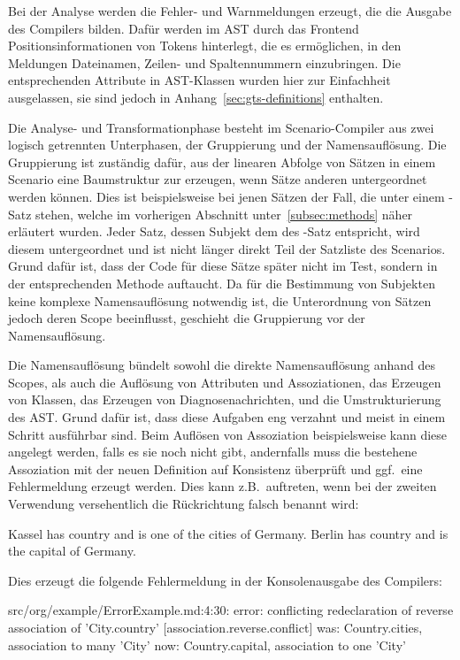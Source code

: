 Bei der Analyse werden die Fehler- und Warnmeldungen erzeugt, die die Ausgabe des Compilers bilden.
Dafür werden im AST durch das Frontend Positionsinformationen von Tokens hinterlegt, die es ermöglichen,
in den Meldungen Dateinamen, Zeilen- und Spaltennummern einzubringen.
Die entsprechenden Attribute in AST-Klassen wurden hier zur Einfachheit ausgelassen,
sie sind jedoch in Anhang~\ref{sec:gts-definitions} enthalten.

Die Analyse- und Transformationphase besteht im Scenario-Compiler aus zwei logisch getrennten Unterphasen,
der Gruppierung und der Namensauflösung.
Die Gruppierung ist zuständig dafür, aus der linearen Abfolge von Sätzen in einem Scenario eine Baumstruktur zur erzeugen,
wenn Sätze anderen untergeordnet werden können.
Dies ist beispielsweise bei jenen Sätzen der Fall, die unter einem -Satz stehen, welche im vorherigen Abschnitt unter~\ref{subsec:methods} näher erläutert wurden.
Jeder Satz, dessen Subjekt dem des -Satz entspricht, wird diesem untergeordnet und ist nicht länger direkt Teil der Satzliste des Scenarios.
Grund dafür ist, dass der Code für diese Sätze später nicht im Test, sondern in der entsprechenden Methode auftaucht.
Da für die Bestimmung von Subjekten keine komplexe Namensauflösung notwendig ist,
die Unterordnung von Sätzen jedoch deren Scope beeinflusst, geschieht die Gruppierung vor der Namensauflösung.

Die Namensauflösung bündelt sowohl die direkte Namensauflösung anhand des Scopes,
als auch die Auflösung von Attributen und Assoziationen, das Erzeugen von Klassen, das Erzeugen von Diagnosenachrichten,
und die Umstrukturierung des AST\@.
Grund dafür ist, dass diese Aufgaben eng verzahnt und meist in einem Schritt ausführbar sind.
Beim Auflösen von Assoziation beispielsweise kann diese angelegt werden, falls es sie noch nicht gibt,
andernfalls muss die bestehene Assoziation mit der neuen Definition auf Konsistenz überprüft und ggf.\ eine Fehlermeldung erzeugt werden.
Dies kann z.B.\ auftreten, wenn bei der zweiten Verwendung versehentlich die Rückrichtung falsch benannt wird:

\begin{codeblock}
    Kassel has country and is one of the cities of Germany.
    Berlin has country and is the capital of Germany.
\end{codeblock}

Dies erzeugt die folgende Fehlermeldung in der Konsolenausgabe des Compilers:

\begin{codeblock}
    src/org/example/ErrorExample.md:4:30: error: conflicting redeclaration of reverse association of 'City.country' [association.reverse.conflict]
    was: Country.cities, association to many 'City'
    now: Country.capital, association to one 'City'
\end{codeblock}

